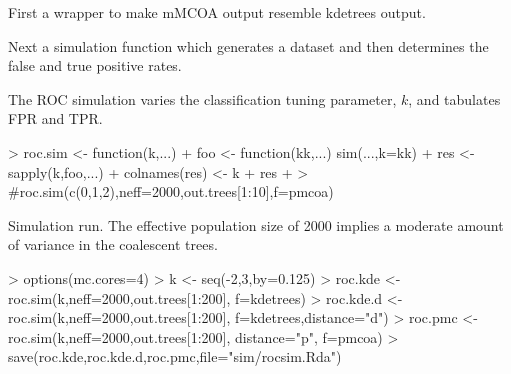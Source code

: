 \documentclass{article}
\begin{document}
First a wrapper to make mMCOA output resemble kdetrees output.
\begin{Schunk}
\end{Schunk}

Next a simulation function which generates a dataset and then
determines the false and true positive rates.
\begin{Schunk}
\end{Schunk}

The ROC simulation varies the classification tuning parameter, $k$,
and tabulates FPR and TPR.
\begin{Schunk}
\begin{Sinput}
> roc.sim <- function(k,...){
+   foo <- function(kk,...) sim(...,k=kk)
+   res <- sapply(k,foo,...)
+   colnames(res) <- k
+   res
+ }
> #roc.sim(c(0,1,2),neff=2000,out.trees[1:10],f=pmcoa)
\end{Sinput}
\end{Schunk}

Simulation run. The effective population size of 2000 implies a
moderate amount of variance in the coalescent trees.
\begin{Schunk}
\begin{Sinput}
> options(mc.cores=4)
> k <- seq(-2,3,by=0.125)
> roc.kde <- roc.sim(k,neff=2000,out.trees[1:200], f=kdetrees)
> roc.kde.d <- roc.sim(k,neff=2000,out.trees[1:200], f=kdetrees,distance="d")
> roc.pmc <- roc.sim(k,neff=2000,out.trees[1:200], distance="p", f=pmcoa)
> save(roc.kde,roc.kde.d,roc.pmc,file="sim/rocsim.Rda")
\end{Sinput}
\end{Schunk}
\end{document}
